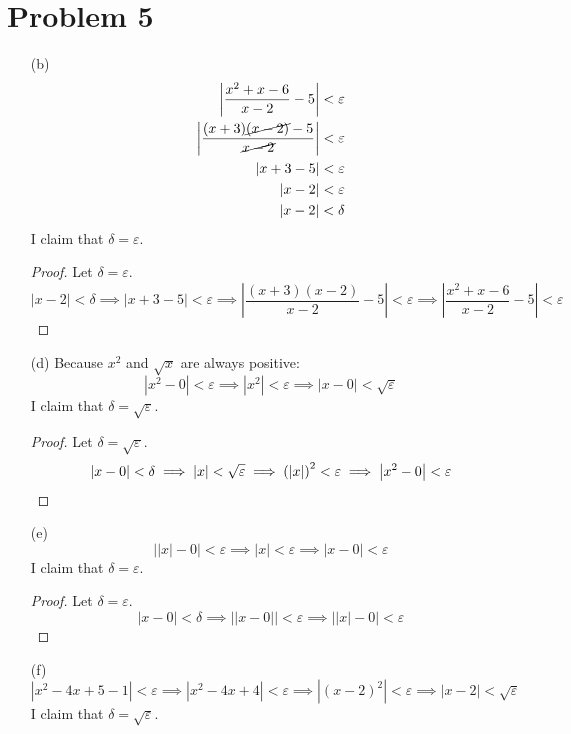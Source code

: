 \documentclass{article}
\newcommand*{\paren}[1]{\ensuremath\left(#1\right)}
\newcommand*{\problem}[1]{\section*{Problem #1}}
\newcommand*{\abs}[1]{\ensuremath{\left|#1\right|}}
\newcommand*{\eps}{\varepsilon}
\begin{document}
\problem{5}
\begin{itemize}
	\item[(b)]
	\begin{align*}
		\abs{\frac{x^2+x-6}{x-2}-5}<\eps \\
		\abs{\frac{(x+3)\cancel{(x-2)}-5}{\cancel{x-2}}}<\eps \\
		\abs{x+3-5}<\eps \\
		\abs{x-2}<\eps \\
		\abs{x-2}<\delta
	\end{align*}
	I claim that $\delta=\eps$.

	\begin{proof}
		Let $\delta=\eps$.
		\begin{equation*}
			\abs{x-2}<\delta
			\implies\abs{x+3-5}<\eps
			\implies\abs{\frac{(x+3)(x-2)}{x-2}-5}<\eps
			\implies\abs{\frac{x^2+x-6}{x-2}-5}<\eps
		\end{equation*}
	\end{proof}


	\item[(d)]
	Because $x^2$ and $\sqrt{x}$ are always positive:
	\begin{equation*}
		\abs{x^2-0}<\eps
		\implies |x^2|<\eps
		\implies |x-0|<\sqrt{\eps}
	\end{equation*}
	I claim that $\delta=\sqrt{\eps}$.

	\begin{proof}
		Let $\delta=\sqrt{\eps}$.
		\begin{equation*}
			\abs{x-0}<\delta
			\implies\abs{x}<\sqrt{\eps} \\
			\implies\paren{\abs{x}}^2<\eps \\
			\implies\abs{x^2-0}<\eps
		\end{equation*}
	\end{proof}

	\item[(e)]
	\begin{equation*}
		\abs{\abs{x}-0}<\eps
		\implies |x|<\eps
		\implies |x-0|<\eps
	\end{equation*}
	I claim that $\delta=\eps$.

	\begin{proof}
		Let $\delta=\eps$.
		\begin{equation*}
			\abs{x-0}<\delta
			\implies\abs{\abs{x-0}}<\eps
			\implies\abs{\abs{x}-0}<\eps
		\end{equation*}
	\end{proof}

	\item[(f)]
	\begin{equation*}
		\abs{x^2-4x+5-1}<\eps
		\implies\abs{x^2-4x+4}<\eps
		\implies\abs{(x-2)^2}<\eps
		\implies\abs{x-2}<\sqrt{\eps}
	\end{equation*}
	I claim that $\delta=\sqrt{\eps}$.


\end{itemize}
\end{document}
